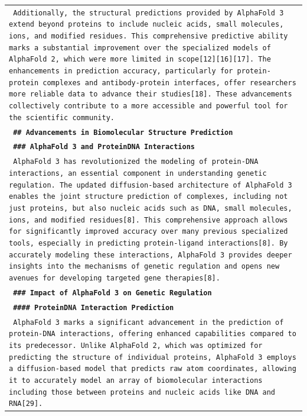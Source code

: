 \documentclass[11pt]{article}
\begin{document}
\begin{longtable}{p{\textwidth}}
\texttt{\small{ Additionally, the structural predictions provided by AlphaFold 3 extend beyond proteins to include nucleic acids, small molecules, ions, and modified residues. This comprehensive predictive ability marks a substantial improvement over the specialized models of AlphaFold 2, which were more limited in scope[12][16][17]. The enhancements in prediction accuracy, particularly for protein-protein complexes and antibody-protein interfaces, offer researchers more reliable data to advance their studies[18]. These advancements collectively contribute to a more accessible and powerful tool for the scientific community. }} \\
\vspace{1pt}
\texttt{\small{\textbf{ \#\# Advancements in Biomolecular Structure Prediction }}} \\
\vspace{1pt}
\texttt{\small{\textbf{ \#\#\# AlphaFold 3 and ProteinDNA Interactions }}} \\
\texttt{\small{ AlphaFold 3 has revolutionized the modeling of protein-DNA interactions, an essential component in understanding genetic regulation. The updated diffusion-based architecture of AlphaFold 3 enables the joint structure prediction of complexes, including not just proteins, but also nucleic acids such as DNA, small molecules, ions, and modified residues[8]. This comprehensive approach allows for significantly improved accuracy over many previous specialized tools, especially in predicting protein-ligand interactions[8]. By accurately modeling these interactions, AlphaFold 3 provides deeper insights into the mechanisms of genetic regulation and opens new avenues for developing targeted gene therapies[8]. }} \\
\vspace{1pt}
\texttt{\small{\textbf{ \#\#\# Impact of AlphaFold 3 on Genetic Regulation }}} \\
\vspace{1pt}
\texttt{\small{\textbf{ \#\#\#\# ProteinDNA Interaction Prediction }}} \\
\texttt{\small{ AlphaFold 3 marks a significant advancement in the prediction of protein-DNA interactions, offering enhanced capabilities compared to its predecessor. Unlike AlphaFold 2, which was optimized for predicting the structure of individual proteins, AlphaFold 3 employs a diffusion-based model that predicts raw atom coordinates, allowing it to accurately model an array of biomolecular interactions including those between proteins and nucleic acids like DNA and RNA[29]. }} \\

\end{longtable}
\end{document}
